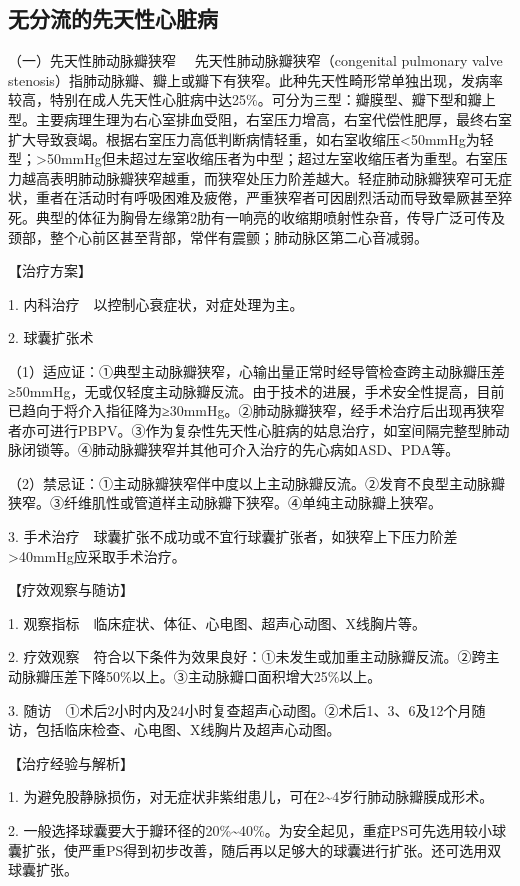 \subsection{无分流的先天性心脏病}

{（一）先天性肺动脉瓣狭窄} 　先天性肺动脉瓣狭窄（congenital pulmonary
valve
stenosis）指肺动脉瓣、瓣上或瓣下有狭窄。此种先天性畸形常单独出现，发病率较高，特别在成人先天性心脏病中达25\%。可分为三型：瓣膜型、瓣下型和瓣上型。主要病理生理为右心室排血受阻，右室压力增高，右室代偿性肥厚，最终右室扩大导致衰竭。根据右室压力高低判断病情轻重，如右室收缩压\textless{}50mmHg为轻型；\textgreater{}50mmHg但未超过左室收缩压者为中型；超过左室收缩压者为重型。右室压力越高表明肺动脉瓣狭窄越重，而狭窄处压力阶差越大。轻症肺动脉瓣狭窄可无症状，重者在活动时有呼吸困难及疲倦，严重狭窄者可因剧烈活动而导致晕厥甚至猝死。典型的体征为胸骨左缘第2肋有一响亮的收缩期喷射性杂音，传导广泛可传及颈部，整个心前区甚至背部，常伴有震颤；肺动脉区第二心音减弱。

【治疗方案】

1. 内科治疗　以控制心衰症状，对症处理为主。

2. 球囊扩张术

（1）适应证：①典型主动脉瓣狭窄，心输出量正常时经导管检查跨主动脉瓣压差≥50mmHg，无或仅轻度主动脉瓣反流。由于技术的进展，手术安全性提高，目前已趋向于将介入指征降为≥30mmHg。②肺动脉瓣狭窄，经手术治疗后出现再狭窄者亦可进行PBPV。③作为复杂性先天性心脏病的姑息治疗，如室间隔完整型肺动脉闭锁等。④肺动脉瓣狭窄并其他可介入治疗的先心病如ASD、PDA等。

（2）禁忌证：①主动脉瓣狭窄伴中度以上主动脉瓣反流。②发育不良型主动脉瓣狭窄。③纤维肌性或管道样主动脉瓣下狭窄。④单纯主动脉瓣上狭窄。

3.
手术治疗　球囊扩张不成功或不宜行球囊扩张者，如狭窄上下压力阶差\textgreater{}40mmHg应采取手术治疗。

【疗效观察与随访】

1. 观察指标　临床症状、体征、心电图、超声心动图、X线胸片等。

2.
疗效观察　符合以下条件为效果良好：①未发生或加重主动脉瓣反流。②跨主动脉瓣压差下降50\%以上。③主动脉瓣口面积增大25\%以上。

3.
随访　①术后2小时内及24小时复查超声心动图。②术后1、3、6及12个月随访，包括临床检查、心电图、X线胸片及超声心动图。

【治疗经验与解析】

1.
为避免股静脉损伤，对无症状非紫绀患儿，可在2\textasciitilde{}4岁行肺动脉瓣膜成形术。

2.
一般选择球囊要大于瓣环径的20\%\textasciitilde{}40\%。为安全起见，重症PS可先选用较小球囊扩张，使严重PS得到初步改善，随后再以足够大的球囊进行扩张。还可选用双球囊扩张。

